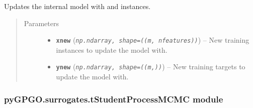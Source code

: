 \documentclass[letterpaper,10pt,english]{sphinxmanual}
\begin{document}
\begin{fulllineitems}
\begin{fulllineitems}
\end{fulllineitems}


\begin{fulllineitems}
\label{pyGPGO.surrogates.tStudentProcess:pyGPGO.surrogates.tStudentProcess.tStudentProcess.update}
Updates the internal model with  and  instances.
\begin{quote}\begin{description}
\item[{Parameters}] \leavevmode\begin{itemize}
\item {} 
\textbf{\texttt{xnew}} (\emph{\texttt{np.ndarray, shape=((m, nfeatures))}}) -- New training instances to update the model with.

\item {} 
\textbf{\texttt{ynew}} (\emph{\texttt{np.ndarray, shape=((m,))}}) -- New training targets to update the model with.

\end{itemize}

\end{description}\end{quote}

\end{fulllineitems}


\end{fulllineitems}



\subsubsection{pyGPGO.surrogates.tStudentProcessMCMC module}
\label{pyGPGO.surrogates.tStudentProcessMCMC:module-pyGPGO.surrogates.tStudentProcessMCMC}\label{pyGPGO.surrogates.tStudentProcessMCMC::doc}\label{pyGPGO.surrogates.tStudentProcessMCMC:pygpgo-surrogates-tstudentprocessmcmc-module}
\end{document}
